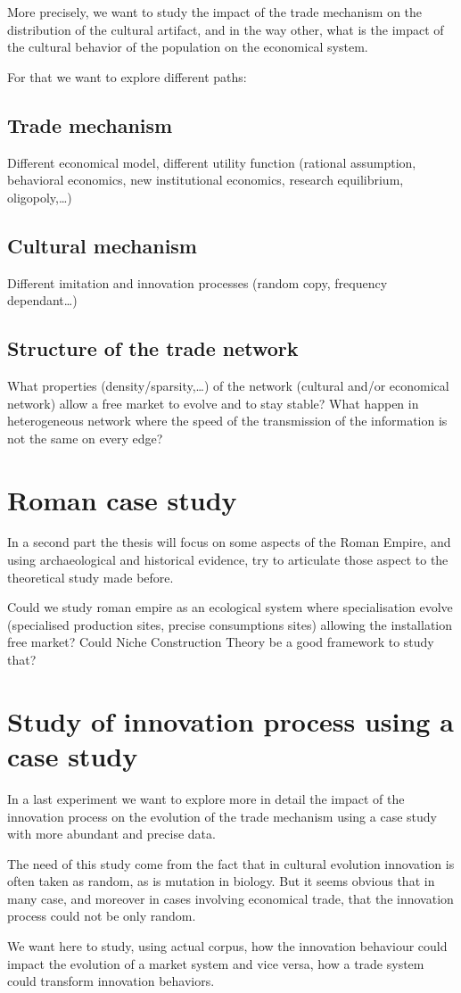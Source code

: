\documentclass[a4paper]{article}
\begin{document}
More precisely, we want to study the impact of the trade mechanism on the distribution of the cultural artifact, and in the way other, what is the impact of the cultural behavior of the population on the economical system.

For that we want to explore different paths:

\subsection{Trade mechanism}
Different economical model, different utility function (rational assumption, behavioral economics, new institutional economics, research equilibrium, oligopoly,\ldots)

\subsection{Cultural mechanism}
Different imitation and innovation processes (random copy, frequency dependant\ldots)

\subsection{Structure of the trade network}
What properties (density/sparsity,\ldots) of the network (cultural and/or economical network) allow a free market to evolve and to stay stable? What happen in heterogeneous network where the speed of the transmission of the information is not the same on every edge?


\section{Roman case study}
In a second part the thesis will focus on some aspects of the Roman Empire, and using archaeological and historical evidence, try to articulate those aspect to the theoretical study made before.


Could we study roman empire as an ecological system where specialisation evolve (specialised production sites, precise consumptions sites) allowing the installation free market? Could Niche Construction Theory be a good framework to study that?

\section{Study of innovation process using a case study}
In a last experiment we want to explore more in detail the impact of the innovation process on the evolution of the trade mechanism using a case study with more abundant and precise data.

The need of this study come from the fact that in cultural evolution innovation is often taken as random, as is mutation in biology. But it seems obvious that in many case, and moreover in cases involving economical trade, that the innovation process could not be only random. 

We want here to study, using actual corpus, how the innovation behaviour could impact the evolution of a market system and vice versa, how a trade system could transform innovation behaviors.
\end{document}
